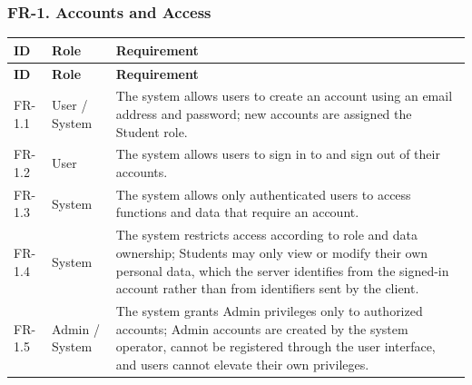 \subsubsection{FR-1. Accounts and Access}
\begin{longtable}{|p{}|p{}|p{}|}
\hline
\textbf{ID} & \textbf{Role} & \textbf{Requirement} \\
\hline
\endfirsthead
\hline
\textbf{ID} & \textbf{Role} & \textbf{Requirement} \\
\hline
\endhead
FR-1.1 & User / System & The system allows users to create an account using an email address and password; new accounts are assigned the Student role. \\
\hline
FR-1.2 & User & The system allows users to sign in to and sign out of their accounts. \\
\hline
FR-1.3 & System & The system allows only authenticated users to access functions and data that require an account. \\
\hline
FR-1.4 & System & The system restricts access according to role and data ownership; Students may only view or modify their own personal data, which the server identifies from the signed-in account rather than from identifiers sent by the client. \\
\hline
FR-1.5 & Admin / System & The system grants Admin privileges only to authorized accounts; Admin accounts are created by the system operator, cannot be registered through the user interface, and users cannot elevate their own privileges. \\
\hline
\end{longtable}


